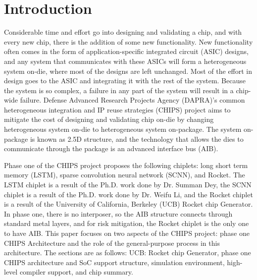 \documentclass[../main.tex]{subfiles}
\begin{document}
\section{Introduction}
Considerable time and effort go into designing and validating a chip, and with every new chip, there is the addition of some new functionality. New functionality often comes in the form of application-specific integrated circuit (ASIC) designs, and any system that communicates with these ASICs will form a heterogeneous system on-die, where most of the designs are left unchanged. Most of the effort in design goes to the ASIC and integrating it with the rest of the system. Because the system is so complex, a failure in any part of the system will result in a chip-wide failure. Defense Advanced Research Projects Agency (DAPRA)'s common heterogeneous integration and IP reuse strategies (CHIPS) project aims to mitigate the cost of designing and validating chip on-die by changing heterogeneous system on-die to heterogeneous system on-package. The system on-package is known as 2.5D structure, and the technology that allows the dies to communicate through the package is an advanced interface bus (AIB). 

Phase one of the CHIPS project proposes the following chiplets: long short term memory (LSTM), sparse convolution neural network (SCNN), and Rocket. The LSTM chiplet is a result of the Ph.D. work done by Dr. Summan Dey, the SCNN chiplet is a result of the Ph.D. work done by Dr. Weifu Li, and the Rocket chiplet is a result of the University of California, Berkeley (UCB) Rocket chip Generator. In phase one, there is no interposer, so the AIB structure connects through standard metal layers, and for risk mitigation, the Rocket chiplet is the only one to have AIB. This paper focuses on two aspects of the CHIPS project: phase one CHIPS Architecture and the role of the general-purpose process in this architecture. The sections are as follows: UCB: Rocket chip Generator, phase one CHIPS architecture and SoC support structure,  simulation environment, high-level compiler support, and chip summary.
\end{document}
